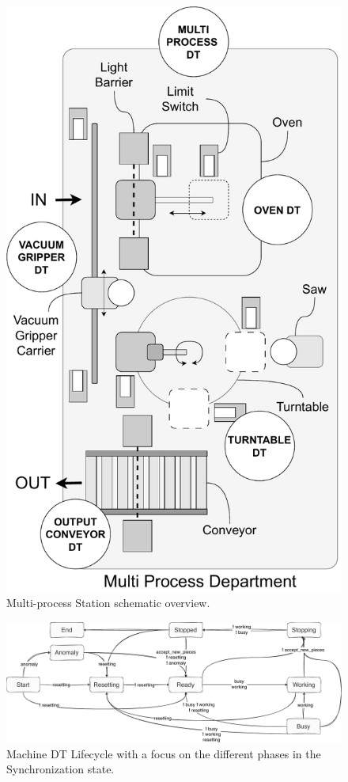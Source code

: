 \begin{figure}[ht]
    \setlength{\belowcaptionskip}{-13pt}
    \centering
    \includegraphics[width=0.9\columnwidth]{figures/dt-lifecycle/multiprocess-station-shcematic-overview.pdf}
    \caption{Multi-process Station schematic overview.}
    \label{fig:multiprocess-station-schematic-overview}
\end{figure}

\begin{figure}
    \setlength{\belowcaptionskip}{-13pt}
    \centering
    \includegraphics[width=\textwidth]{figures/dt-lifecycle/graph_machine_logic.pdf}
    \caption{Machine DT Lifecycle with a focus on the different phases in the Synchronization state.}
    \label{fig:graph-machine-logic}
\end{figure}

